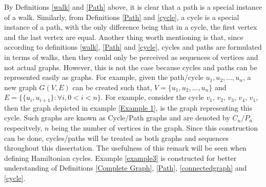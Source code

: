 \documentclass[12pt]{article}
\numberwithin{equation}{subsection}
\numberwithin{table}{subsection}
\numberwithin{algorithm}{subsection}
\numberwithin{figure}{subsection}
\begin{document}
By Definitions \ref{walk} and \ref{Path} above, it is clear that a path is a special instance of a walk. Similarly, from Definitions \ref{Path} and \ref{cycle}, a cycle is a special instance of a path, with the only difference being that in a cycle, the first vertex and the last vertex are equal. Another thing worth mentioning is that, since according to definitions \ref{walk}, \ref{Path} and \ref{cycle}, cycles and paths are formulated in terms of walks, then they could only be perceived as sequences of vertices and not actual graphs. However, this is not the case because cycles and paths can be represented easily as graphs. For example, given the path/cycle $\mathit{u_1, u_2, ...,u_n}$, a new graph $\mathit{G(V,E)}$ can be created such that, $\mathit{V= \{ u_1, u_2, ..., u_n\}}$ and $\mathit{E = \{ \{u_i, u_{i+1}\} : \forall i, 0 < i < n\}}$. For example, consider the cycle $v_1$, $v_2$, $v_3$, $v_4$, $v_1$, then the graph depicted in example \ref{Example 1}, is the graph representing this cycle. Such graphs are known as Cycle/Path graphs and are denoted by $\mathit{C_n/P_n}$ respecitvely, $\mathit{n}$ being the number of vertices in the graph. Since this construction can be done, cycles/paths will be treated as both graphs and sequences throughout this dissertation. The usefulness of this remark will be seen when defining Hamiltonian cycles. Example \ref{example3} is constructed for better understanding of Definitions \ref{Complete Graph}, \ref{Path}, \ref{connectedgraph} and \ref{cycle}.
\end{document}
